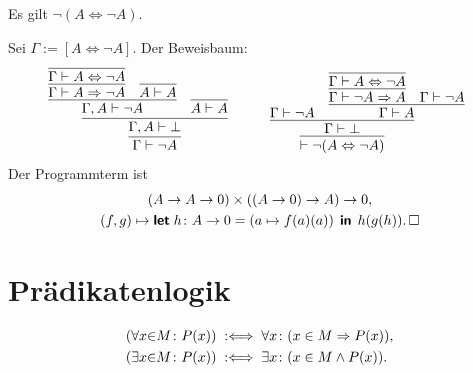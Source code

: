 \begin{Satz}\label{non-eq-prop-neg}
Es gilt $\neg (A\Leftrightarrow\neg A)$.
\end{Satz}
\begin{Beweis}
Sei $\Gamma:=[A\Leftrightarrow\neg A]$. Der Beweisbaum:
\[
\begin{array}{@{}l@{\qquad\quad}l}
\infer{\Gamma\vdash\neg A}{
  \infer{\Gamma,A\vdash\bot}{
    \infer{\Gamma,A\vdash\neg A}{
      \infer{\Gamma\vdash A\Rightarrow\neg A}{
        \infer{\Gamma\vdash A\Leftrightarrow\neg A}{}}
    & \infer{A\vdash A}{}}
  & \infer{A\vdash A}{}}}
&
\infer{\vdash\neg (A\Leftrightarrow\neg A)}{
  \infer{\Gamma\vdash\bot}{
    \Gamma\vdash\neg A
  & \infer{\Gamma\vdash A}{
      \infer{\Gamma\vdash\neg A\Rightarrow A}{
        \infer{\Gamma\vdash A\Leftrightarrow\neg A}{}}
    & \Gamma\vdash\neg A}}}
\end{array}
\]
Der Programmterm ist
\begin{gather*}
(A\to A\to 0)\times ((A\to 0)\to A)\to 0,\\
(f,g)\mapsto\text{{\normalfont\sffamily\bfseries let}}\; h\colon A\to 0 = (a\mapsto f(a)(a))
\;\,\text{{\normalfont\sffamily\bfseries in}}\;\, h(g(h)).\,\square
\end{gather*}
\end{Beweis}

\newpage
\section{Prädikatenlogik}

\begin{Definition}%
\label{def:bounded}
\begin{align*}
(\forall x{\in}M\colon P(x)) &\;:\Longleftrightarrow\; \forall x\colon (x\in M\Rightarrow P(x)),\\
(\exists x{\in}M\colon P(x)) &\;:\Longleftrightarrow\; \exists x\colon (x\in M\land P(x)).
\end{align*}
\end{Definition}

